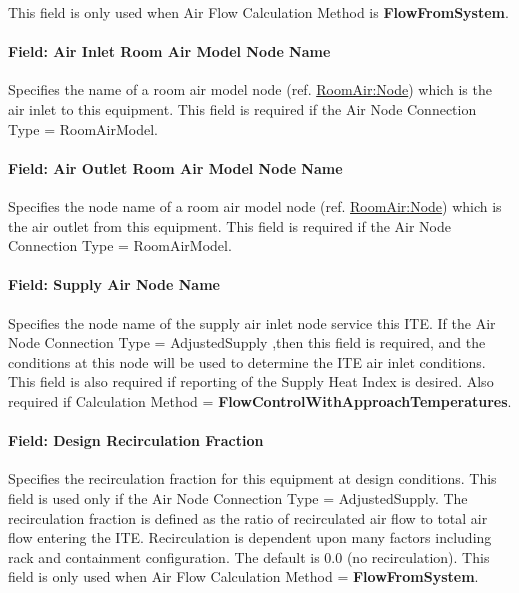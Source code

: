 This field is only used when Air Flow Calculation Method is \textbf{FlowFromSystem}.

\paragraph{Field: Air Inlet Room Air Model Node Name}\label{field-air-inlet-room-air-model-node-name}

Specifies the name of a room air model node (ref. \hyperref[roomairnode]{RoomAir:Node}) which is the air inlet to this equipment. This field is required if the Air Node Connection Type = RoomAirModel.

\paragraph{Field: Air Outlet Room Air Model Node Name}\label{field-air-outlet-room-air-model-node-name}

Specifies the node name of a room air model node (ref. \hyperref[roomairnode]{RoomAir:Node}) which is the air outlet from this equipment. This field is required if the Air Node Connection Type = RoomAirModel.

\paragraph{Field: Supply Air Node Name}\label{field-supply-air-node-name}

Specifies the node name of the supply air inlet node service this ITE. If the Air Node Connection Type = AdjustedSupply ,then this field is required, and the conditions at this node will be used to determine the ITE air inlet conditions. This field is also required if reporting of the Supply Heat Index is desired. Also required if Calculation Method = \textbf{FlowControlWithApproachTemperatures}.

\paragraph{Field: Design Recirculation Fraction}\label{field-design-recirculation-fraction}

Specifies the recirculation fraction for this equipment at design conditions. This field is used only if the Air Node Connection Type = AdjustedSupply. The recirculation fraction is defined as the ratio of recirculated air flow to total air flow entering the ITE. Recirculation is dependent upon many factors including rack and containment configuration. The default is 0.0 (no recirculation). This field is only used when Air Flow Calculation Method = \textbf{FlowFromSystem}.

